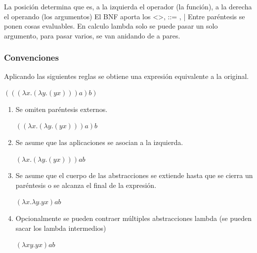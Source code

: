 La posición determina que es, a la izquierda el operador (la función), a la derecha el operando (los argumentos)
El BNF aporta los <>, ::= , |
Entre paréntesis se ponen cosas evaluables.
En calculo lambda solo se puede pasar un solo argumento, para pasar varios, se van anidando de a pares.

\subsubsection*{Convenciones}
Aplicando las siguientes reglas se obtiene una expresión equivalente a la original.

\begin{center}
\begin{math}
(((\lambda x.(\lambda y.(y x))) a) b)
\end{math}  
\end{center}



\begin{enumerate}
    
\item Se omiten paréntesis externos.

\begin{center}
\begin{math}
((\lambda x.(\lambda y.(y x))) a) b 
\end{math}  
\end{center}


\item Se asume que las aplicaciones se asocian a la izquierda.

\begin{center}
\begin{math}
(\lambda x.(\lambda y.(y x))) a b
\end{math}  
\end{center}

\item Se asume que el cuerpo de las abstracciones se extiende hasta que se cierra un paréntesis o se alcanza el final de la expresión.

\begin{center}
\begin{math}
(\lambda x.\lambda y.y x) a b
\end{math}  
\end{center}

\item Opcionalmente se pueden contraer múltiples abstracciones lambda (se pueden sacar los lambda intermedios)

\begin{center}
\begin{math}
(\lambda x y.y x) a b
\end{math}  
\end{center}

\end{enumerate}

